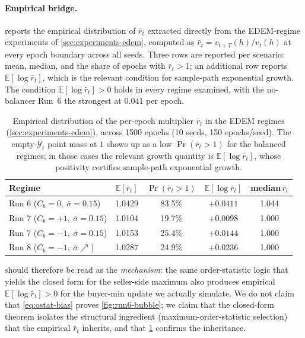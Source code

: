 \paragraph{Empirical bridge.}
 reports the empirical distribution of
$\bar{r}_{t}$ extracted directly from the EDEM-regime experiments of
\cref{sec:experiments-edem}, computed as
$\bar{r}_{t} = v_{t+T}(h)/v_{t}(h)$ at every epoch boundary across
all seeds. Three rows are reported per scenario: mean, median, and
the share of epochs with $\bar{r}_{t}>1$; an additional row reports
$\mathbb{E}[\log \bar{r}_{t}]$, which is the relevant
condition for sample-path exponential growth. The condition
$\mathbb{E}[\log \bar{r}_{t}] > 0$ holds in every regime examined,
with the no-balancer Run~6 the strongest at $0.041$ per epoch.

\begin{table}[h]
\centering
\small
\caption{Empirical distribution of the per-epoch multiplier
$\bar{r}_{t}$ in the EDEM regimes (\cref{sec:experiments-edem}),
across 1500 epochs (10 seeds, 150 epochs/seed). The
empty-$\mathcal{Y}_{t}$ point mass at $1$ shows up as a low
$\Pr(\bar{r}_{t}>1)$ for the balanced regimes; in those cases the
relevant growth quantity is $\mathbb{E}[\log \bar{r}_{t}]$, whose
positivity certifies sample-path exponential growth.}
\label{tab:rbar-empirical}
\begin{tabular}{l c c c c}
\toprule
\textbf{Regime} & $\mathbb{E}[\bar r_t]$ & $\Pr(\bar r_t>1)$ & $\mathbb{E}[\log \bar r_t]$ & median$\,\bar r_t$ \\
\midrule
Run 6 ($C_b=0,\ \bar\sigma=0.15$)            & 1.0429 & 83.5\% & $+0.0411$ & 1.044 \\
Run 7 ($C_b=+1,\ \bar\sigma=0.15$)           & 1.0104 & 19.7\% & $+0.0098$ & 1.000 \\
Run 7 ($C_b=-1,\ \bar\sigma=0.15$)           & 1.0153 & 25.4\% & $+0.0144$ & 1.000 \\
Run 8 ($C_b=-1,\ \bar\sigma\!\nearrow$)      & 1.0287 & 24.9\% & $+0.0236$ & 1.000 \\
\bottomrule
\end{tabular}
\end{table}

 should therefore be read as the
\emph{mechanism}: the same order-statistic logic that yields the
closed form for the seller-side maximum also produces empirical
$\mathbb{E}[\log \bar{r}_{t}] > 0$ for the buyer-min update we
actually simulate. We do not claim that
\cref{eq:ostat-bias} proves \cref{fig:run6-bubble}; we claim that
the closed-form theorem isolates the structural ingredient
(maximum-order-statistic selection) that the empirical
$\bar{r}_{t}$ inherits, and that \cref{tab:rbar-empirical} confirms
the inheritance.

